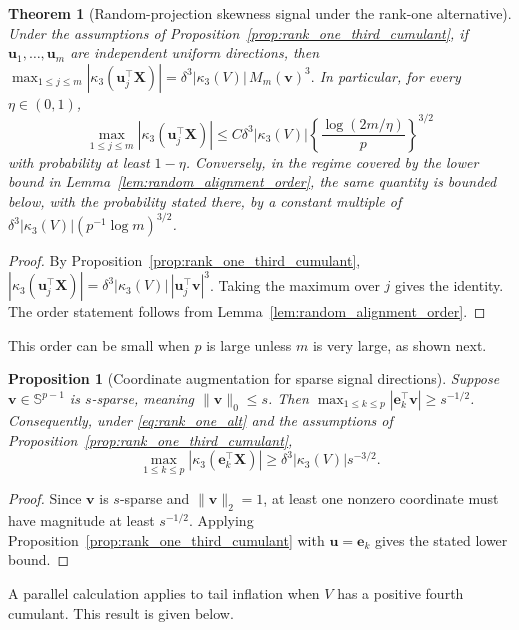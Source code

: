 \documentclass[11pt]{article}
\theoremstyle{plain}
\newtheorem{theorem}{Theorem}
\newtheorem{proposition}{Proposition}
\theoremstyle{definition}
\theoremstyle{remark}
\def\X{\bm{X}}
\def\u{\bm{u}}
\def\v{\bm{v}}
\newcommand{\abs}[1]{\left\lvert #1 \right\rvert}
\begin{document}
\begin{theorem}[Random-projection skewness signal under the rank-one alternative]
	\label{thm:rank_one_random_projection_skew_signal}
	Under the assumptions of Proposition~\ref{prop:rank_one_third_cumulant}, if \(\u_1,\ldots,\u_m\) are independent uniform directions, then
	\(
	\max_{1\leqslant j\leqslant m} \abs{\kappa_3\left(\u_j^\top \X\right)} = \delta^3 \abs{\kappa_3(V)} \,M_m(\v)^3.
	\)
	In particular, for every \(\eta\in(0,1)\),
	\[
	\max_{1\leqslant j\leqslant m} \abs{\kappa_3(\u_j^\top \X)} \leqslant C\delta^3 \abs{\kappa_3(V)} \left\{\frac{\log(2m/\eta)}{p}\right\}^{3/2}
	\]
	with probability at least \(1-\eta\). Conversely, in the regime covered by the lower bound in Lemma~\ref{lem:random_alignment_order}, the same quantity is bounded below, with the probability stated there, by a constant multiple of $\delta^3 \abs{\kappa_3(V)} \left(p^{-1}\log m\right)^{3/2}$.
\end{theorem}

\begin{proof}
	By Proposition~\ref{prop:rank_one_third_cumulant}, \(|\kappa_3(\u_j^\top \X)|=\delta^3|\kappa_3(V)|\,|\u_j^\top \v|^3\). Taking the maximum over \(j\) gives the identity. The order statement follows from Lemma~\ref{lem:random_alignment_order}.
\end{proof}

This order can be small when \(p\) is large unless \(m\) is very large, as shown next.

\begin{proposition}[Coordinate augmentation for sparse signal directions]
	\label{prop:coordinate_sparse_signal}
	Suppose \(\v\in \mathbb{S}^{p-1}\) is \(s\)-sparse, meaning \(\|\v\|_0\leqslant s\). Then \(\max_{1\leqslant k\leqslant p}|\bm{e}_k^\top \v|\geqslant s^{-1/2}\). Consequently, under \eqref{eq:rank_one_alt} and the assumptions of Proposition~\ref{prop:rank_one_third_cumulant},
	\[
	\max_{1\leqslant k\leqslant p} \abs{\kappa_3\left(\bm e_k^\top \X\right)} 	\geqslant \delta^3 \abs{\kappa_3(V)}s^{-3/2}.
	\]
\end{proposition}

\begin{proof}
	Since \(\v\) is \(s\)-sparse and \(\|\v\|_2=1\), at least one nonzero coordinate must have magnitude at least \(s^{-1/2}\). Applying Proposition~\ref{prop:rank_one_third_cumulant} with \(\u= \bm e_k\) gives the stated lower bound.
\end{proof}

A parallel calculation applies to tail inflation when \(V\) has a positive fourth cumulant. This result is given below.
\end{document}
